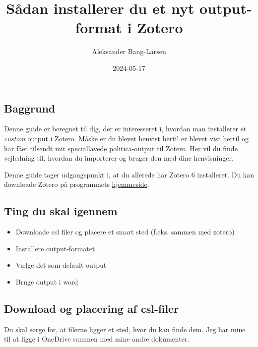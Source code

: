 \documentclass[
  a4paper,
  DIV=11,
  numbers=noendperiod,
  oneside]{scrartcl}
\title{Sådan installerer du et nyt output-format i Zotero}
\author{Aleksander Bang-Larsen}
\date{2024-05-17}
\providecommand{\tightlist}{%
  \setlength{\itemsep}{0pt}\setlength{\parskip}{0pt}}\usepackage{longtable,booktabs,array}
\renewcommand*\contentsname{Indholdsfortegnelse}
\newcommand\contentsname{Indholdsfortegnelse}
\begin{document}
\maketitle

\renewcommand*\contentsname{Indholdsfortegnelse}
{
\hypersetup{linkcolor=}
\setcounter{tocdepth}{3}
\tableofcontents
}

\subsection{Baggrund}\label{baggrund}

Denne guide er beregnet til dig, der er interesseret i, hvordan man
installerer et \emph{custom} output i Zotero. Måske er du blevet henvist
hertil er blevet vist hertil og har fået tilsendt mit speciallavede
politica-output til Zotero. Her vil du finde vejledning til, hvordan du
importerer og bruger den med dine henvisninger.

Denne guide tager udgangspunkt i, at du allerede har Zotero 6
installeret. Du kan downloade Zotero på programmets
\href{https://www.zotero.org/download/}{hjemmeside}.

\subsection{Ting du skal igennem}\label{ting-du-skal-igennem}

\begin{itemize}
\tightlist
\item
  Downloade csl filer og placere et smart sted (f.eks. sammen med
  zotero)
\item
  Installere output-formatet
\item
  Vælge det som default output
\item
  Bruge output i word
\end{itemize}

\subsection{Download og placering af
csl-filer}\label{download-og-placering-af-csl-filer}

Du skal sørge for, at filerne ligger et sted, hvor du kan finde dem. Jeg
har mine til at ligge i OneDrive sammen med mine andre dokumenter.
\end{document}
